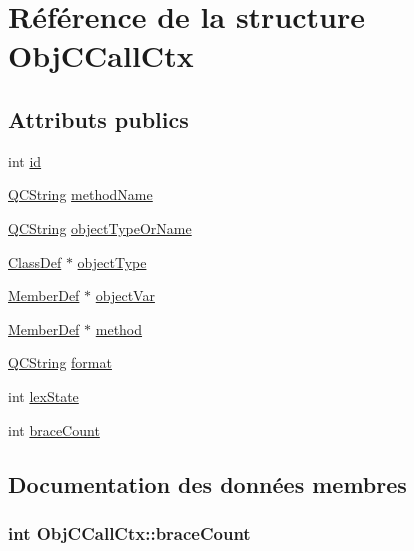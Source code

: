 \hypertarget{struct_obj_c_call_ctx}{}\section{Référence de la structure Obj\+C\+Call\+Ctx}
\label{struct_obj_c_call_ctx}
\subsection*{Attributs publics}
\begin{DoxyCompactItemize}
\item 
int \hyperlink{struct_obj_c_call_ctx_a7113c7185e9c8f0748e0bb9aad716b15}{id}
\item 
\hyperlink{class_q_c_string}{Q\+C\+String} \hyperlink{struct_obj_c_call_ctx_a97c3692c9141e5847d45cb7f76e0a59b}{method\+Name}
\item 
\hyperlink{class_q_c_string}{Q\+C\+String} \hyperlink{struct_obj_c_call_ctx_a4ffd01a3580f6fdebef2c91cf801b878}{object\+Type\+Or\+Name}
\item 
\hyperlink{class_class_def}{Class\+Def} $\ast$ \hyperlink{struct_obj_c_call_ctx_ad7d8cfa217a374e1c9bd04b4e56c5116}{object\+Type}
\item 
\hyperlink{class_member_def}{Member\+Def} $\ast$ \hyperlink{struct_obj_c_call_ctx_aa6bf125d3fbb6558b0c8f8f1653044c2}{object\+Var}
\item 
\hyperlink{class_member_def}{Member\+Def} $\ast$ \hyperlink{struct_obj_c_call_ctx_adcd04e96a99de530c229b75ae7a79890}{method}
\item 
\hyperlink{class_q_c_string}{Q\+C\+String} \hyperlink{struct_obj_c_call_ctx_ad77bc16112b96dd40ecb41523fc3ef5f}{format}
\item 
int \hyperlink{struct_obj_c_call_ctx_a36959b7ba4f67b82e7613ddecd170fd6}{lex\+State}
\item 
int \hyperlink{struct_obj_c_call_ctx_a22e1388f453f757d56f0c32a01a11783}{brace\+Count}
\end{DoxyCompactItemize}


\subsection{Documentation des données membres}
\hypertarget{struct_obj_c_call_ctx_a22e1388f453f757d56f0c32a01a11783}{}
\subsubsection[{brace\+Count}]{\setlength{\rightskip}{0pt plus 5cm}int Obj\+C\+Call\+Ctx\+::brace\+Count}\label{struct_obj_c_call_ctx_a22e1388f453f757d56f0c32a01a11783}
\hypertarget{struct_obj_c_call_ctx_ad77bc16112b96dd40ecb41523fc3ef5f}{}
